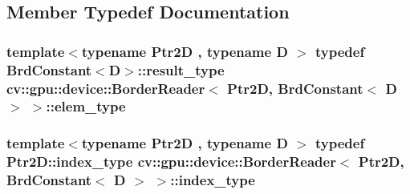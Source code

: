 \subsection{Member Typedef Documentation}
\hypertarget{structcv_1_1gpu_1_1device_1_1BorderReader_3_01Ptr2D_00_01BrdConstant_3_01D_01_4_01_4_acd446c4cfb5a03a9dbda2998fdff16e1}{
\subsubsection[{elem\-\_\-type}]{\setlength{\rightskip}{0pt plus 5cm}template$<$typename Ptr2\-D , typename D $>$ typedef {\bf Brd\-Constant}$<$D$>$\-::result\-\_\-type {\bf cv\-::gpu\-::device\-::\-Border\-Reader}$<$ Ptr2\-D, {\bf Brd\-Constant}$<$ D $>$ $>$\-::{\bf elem\-\_\-type}}}\label{structcv_1_1gpu_1_1device_1_1BorderReader_3_01Ptr2D_00_01BrdConstant_3_01D_01_4_01_4_acd446c4cfb5a03a9dbda2998fdff16e1}
\hypertarget{structcv_1_1gpu_1_1device_1_1BorderReader_3_01Ptr2D_00_01BrdConstant_3_01D_01_4_01_4_a45086495eea2ee4821dc4834dfe7b3a5}{
\subsubsection[{index\-\_\-type}]{\setlength{\rightskip}{0pt plus 5cm}template$<$typename Ptr2\-D , typename D $>$ typedef Ptr2\-D\-::index\-\_\-type {\bf cv\-::gpu\-::device\-::\-Border\-Reader}$<$ Ptr2\-D, {\bf Brd\-Constant}$<$ D $>$ $>$\-::{\bf index\-\_\-type}}}\label{structcv_1_1gpu_1_1device_1_1BorderReader_3_01Ptr2D_00_01BrdConstant_3_01D_01_4_01_4_a45086495eea2ee4821dc4834dfe7b3a5}


